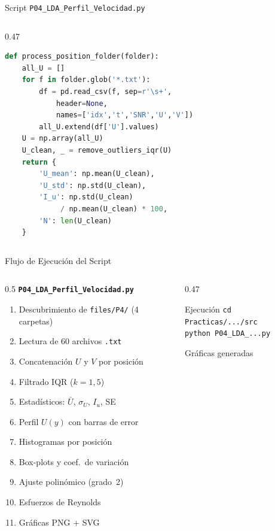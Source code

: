 \documentclass[aspectratio=169,12pt]{beamer}
\begin{document}
\begin{frame}[fragile]{Script \texttt{P04\_LDA\_Perfil\_Velocidad.py}}
\begin{columns}
\begin{column}{0.47\textwidth}
\begin{lstlisting}[language=Python]
def process_position_folder(folder):
    all_U = []
    for f in folder.glob('*.txt'):
        df = pd.read_csv(f, sep=r'\s+',
            header=None,
            names=['idx','t','SNR','U','V'])
        all_U.extend(df['U'].values)
    U = np.array(all_U)
    U_clean, _ = remove_outliers_iqr(U)
    return {
        'U_mean': np.mean(U_clean),
        'U_std': np.std(U_clean),
        'I_u': np.std(U_clean)
             / np.mean(U_clean) * 100,
        'N': len(U_clean)
    }
			\end{lstlisting}
		\end{column}
	\end{columns}
\end{frame}

\begin{frame}{Flujo de Ejecución del Script}
	\begin{columns}
		\begin{column}{0.5\textwidth}
			\textbf{\texttt{P04\_LDA\_Perfil\_Velocidad.py}}\\[0.3em]
			\scriptsize
			\begin{enumerate}
				\item Descubrimiento de \texttt{files/P4/}
				      (4 carpetas)
				\item Lectura de 60 archivos \texttt{.txt}
				\item Concatenación $U$ y $V$ por posición
				\item Filtrado IQR ($k = 1{,}5$)
				\item Estadísticos: $\bar{U}$, $\sigma_U$,
				      $I_u$, SE
				\item Perfil $U(y)$ con barras de error
				\item Histogramas por posición
				\item Box-plots y coef.\ de variación
				\item Ajuste polinómico (grado~2)
				\item Esfuerzos de Reynolds
				\item Gráficas PNG + SVG
			\end{enumerate}
		\end{column}
		\begin{column}{0.47\textwidth}
			\begin{exampleblock}{Ejecución}
				\texttt{cd Practicas/.../src}\\
				\texttt{python P04\_LDA\_...py}
			\end{exampleblock}
			\vspace{0.3em}
			\begin{block}{Gráficas generadas}

\end{block}
\end{column}
\end{columns}
\end{frame}
\end{document}
